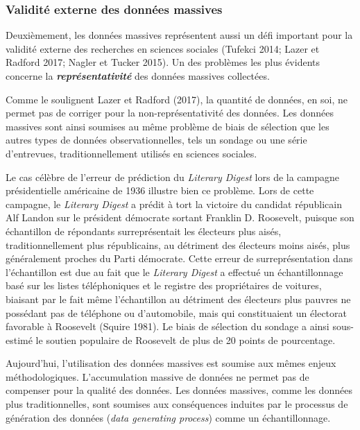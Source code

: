 \documentclass[
  letterpaper,
  DIV=11,
  numbers=noendperiod]{scrreprt}
\begin{document}
\subsubsection*{Validité externe des données
massives}\label{validituxe9-externe-des-donnuxe9es-massives}

Deuxièmement, les données massives représentent aussi un défi important
pour la validité externe des recherches en sciences sociales (Tufekci
2014; Lazer et Radford 2017; Nagler et Tucker 2015). Un des problèmes
les plus évidents concerne la \textbf{\emph{représentativité}} des
données massives collectées.

Comme le soulignent Lazer et Radford (2017), la quantité de données, en
soi, ne permet pas de corriger pour la non-représentativité des données.
Les données massives sont ainsi soumises au même problème de biais de
sélection que les autres types de données observationnelles, tels un
sondage ou une série d'entrevues, traditionnellement utilisés en
sciences sociales.

Le cas célèbre de l'erreur de prédiction du \emph{Literary Digest} lors
de la campagne présidentielle américaine de 1936 illustre bien ce
problème. Lors de cette campagne, le \emph{Literary Digest} a prédit à
tort la victoire du candidat républicain Alf Landon sur le président
démocrate sortant Franklin D. Roosevelt, puisque son échantillon de
répondants surreprésentait les électeurs plus aisés, traditionnellement
plus républicains, au détriment des électeurs moins aisés, plus
généralement proches du Parti démocrate. Cette erreur de
surreprésentation dans l'échantillon est due au fait que le
\emph{Literary Digest} a effectué un échantillonnage basé sur les listes
téléphoniques et le registre des propriétaires de voitures, biaisant par
le fait même l'échantillon au détriment des électeurs plus pauvres ne
possédant pas de téléphone ou d'automobile, mais qui constituaient un
électorat favorable à Roosevelt (Squire 1981). Le biais de sélection du
sondage a ainsi sous-estimé le soutien populaire de Roosevelt de plus de
20 points de pourcentage.

Aujourd'hui, l'utilisation des données massives est soumise aux mêmes
enjeux méthodologiques. L'accumulation massive de données ne permet pas
de compenser pour la qualité des données. Les données massives, comme
les données plus traditionnelles, sont soumises aux conséquences
induites par le processus de génération des données (\emph{data
generating process}) comme un échantillonnage.
\end{document}
